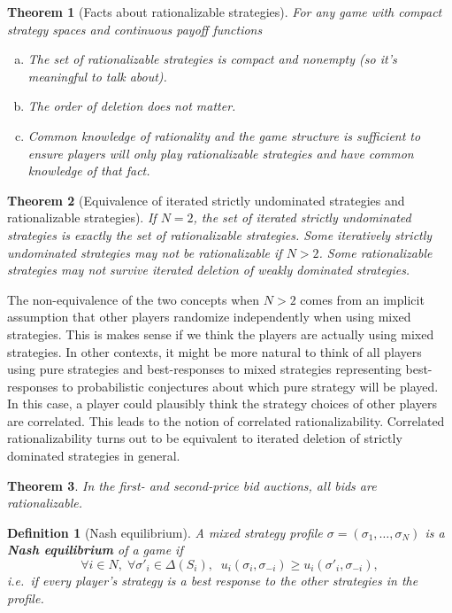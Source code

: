 \documentclass[letter, 11pt]{article}
\theoremstyle{basic}
\newtheorem{definition}{Definition}[section]
\newtheorem{theorem}{Theorem}[section]
\begin{document}
\begin{spacing}{1.0}
\begin{theorem}[Facts about rationalizable strategies]
  For any game with compact
  strategy spaces and continuous payoff functions
  \begin{enumerate}[a)]\leftskip = 1em
  \item The set of rationalizable strategies is compact and
    nonempty (so it's meaningful to talk about).
  \item The order of deletion does not matter.
  \item Common knowledge of rationality and the game structure is
    sufficient to ensure players will only play rationalizable strategies
    and have common knowledge of that fact.
  \end{enumerate}
\end{theorem}

\begin{theorem}[Equivalence of iterated strictly undominated strategies and
  rationalizable strategies]
  If $N=2$, the set of iterated strictly
  undominated strategies is exactly the set of rationalizable
  strategies. Some iteratively strictly undominated strategies may not be
  rationalizable if $N>2$. Some rationalizable strategies may not survive
  iterated deletion of weakly dominated strategies.
\end{theorem}

The non-equivalence of the two concepts when $N>2$ comes from an implicit
assumption that other players randomize independently when using mixed
strategies. This is makes sense if we think the players are
actually using mixed strategies. In other contexts, it might be more
natural to think of all players using pure strategies and best-responses to
mixed strategies representing best-responses to probabilistic conjectures
about which pure strategy will be played. In this case, a player could
plausibly think the strategy choices of other players are correlated. This
leads to the notion of correlated rationalizability. Correlated
rationalizability turns out to be equivalent to iterated deletion of
strictly dominated strategies in general.

\begin{theorem}
  In the first- and second-price bid auctions, all bids are rationalizable.
\end{theorem}

\begin{definition}[Nash equilibrium]
  A mixed strategy profile $\sigma = \left(\sigma_1,
    \ldots, \sigma_N\right)$ is a \textbf{Nash equilibrium} of a game
  if \[\forall i \in N,\; \forall \sigma'_i\in \Delta(S_i),\;\;
  u_i(\sigma_i, \sigma_{-i}) \geq u_i(\sigma'_i, \sigma_{-i}),\] i.e.~if
  every player's strategy is a best response to the other strategies in the
  profile.
\end{definition}


\end{spacing}
\end{document}
